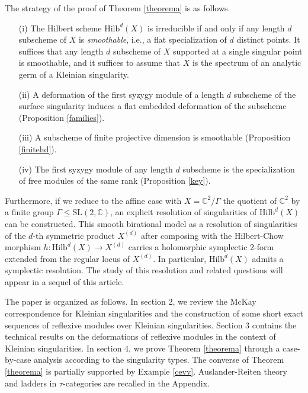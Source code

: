 \documentclass{amsart}[12pt]
\theoremstyle{definition}
\theoremstyle{remark}
\numberwithin{equation}{section}
\begin{document}
The strategy of the proof of Theorem \ref{theorema} is as follows.
\begin{itemize}
\item[(i)] The Hilbert scheme $\mathrm{Hilb}^d(X)$ is irreducible if and only if any length $d$ subscheme of $X$ is \textit{smoothable}, i.e., a flat specialization of $d$ distinct points. It suffices that any length $d$ subscheme of $X$ supported at a single singular point is smoothable, and it suffices to assume that $X$ is the spectrum of an analytic germ of a Kleinian singularity. 
\item[(ii)] A deformation of the first syzygy module of a length $d$ subscheme of the surface singularity induces a flat embedded deformation of the subscheme (Proposition \ref{families}).
\item[(iii)] A subscheme of finite projective dimension is smoothable (Proposition \ref{finitehd}).
\item[(iv)] The first syzygy module of any length $d$ subscheme is the specialization of free modules of the same rank (Proposition \ref{key}). 
\end{itemize}

Furthermore, if we reduce to the affine case with $X = \mathbb{C}^2/\Gamma$ the quotient of $\mathbb{C}^2$ by a finite group $\Gamma \leq \mathrm{SL}(2, \mathbb{C})$, an explicit resolution of singularities of $\mathrm{Hilb}^d(X)$ can be constructed. This smooth birational model as a resolution of singularities of the $d$-th symmetric product $X^{(d)}$ after composing with the Hilbert-Chow morphism $h: \mathrm{Hilb}^d(X) \to X^{(d)}$ carries a holomorphic symplectic 2-form extended from the regular locus of $X^{(d)}$. In particular, $\mathrm{Hilb}^d(X)$ admits a symplectic resolution. The study of this resolution and related questions will appear in a sequel of this article. 

The paper is organized as follows. In section 2, we review the McKay correspondence for Kleinian singularities and the construction of some short exact sequences of reflexive modules over Kleinian singularities. Section 3 contains the technical results on the deformations of reflexive modules in the context of Kleinian singularities. In section 4, we prove Theorem \ref{theorema} through a case-by-case analysis according to the singularity types. The converse of Theorem \ref{theorema} is partially supported by Example \ref{cevv}. Auslander-Reiten theory and ladders in $\tau$-categories are recalled in the Appendix.
\end{document}
